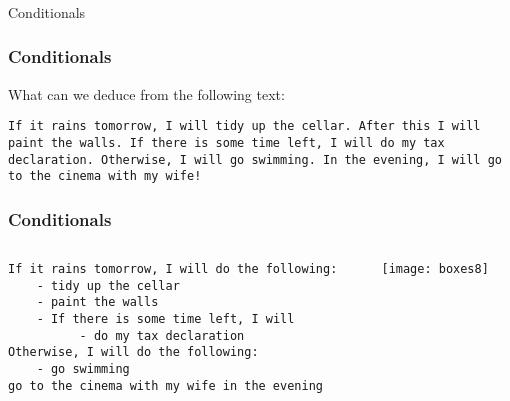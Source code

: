 \begin{frame}[fragile]\frametitle{}
\begin{center}
{\Large Conditionals}
\end{center}
\end{frame}

\begin{frame}[fragile]\frametitle{Conditionals}
What can we deduce from the following text:
\begin{lstlisting}
If it rains tomorrow, I will tidy up the cellar. After this I will paint the walls. If there is some time left, I will do my tax declaration. Otherwise, I will go swimming. In the evening, I will go to the cinema with my wife!
\end{lstlisting}
\end{frame}

\begin{frame}[fragile]\frametitle{Conditionals}
  \begin{columns}[c]
    \begin{column}{0.5\linewidth}
\begin{lstlisting}
If it rains tomorrow, I will do the following:
    - tidy up the cellar 
    - paint the walls
    - If there is some time left, I will 
          - do my tax declaration
Otherwise, I will do the following:
    - go swimming
go to the cinema with my wife in the evening
\end{lstlisting}
      \end{column}
    \begin{column}{0.5\linewidth}
    \begin{center}
\texttt{[image: boxes8]}
\end{center}
        \end{column}
  \end{columns}
\end{frame}

